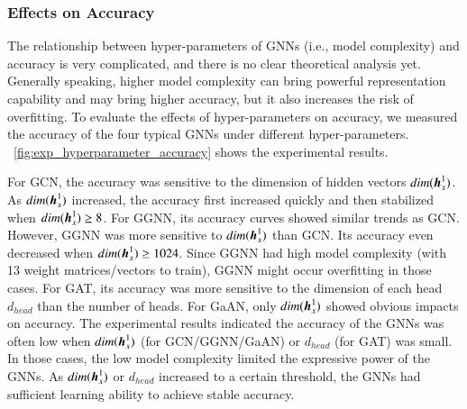 \subsubsection{Effects on Accuracy}

The relationship between hyper-parameters of GNNs (i.e., model complexity) and accuracy is very complicated, and there is no clear theoretical analysis yet.
%
Generally speaking, higher model complexity can bring powerful representation capability and may bring higher accuracy, but it also increases the risk of overfitting.
%
To evaluate the effects of hyper-parameters on accuracy, we measured the accuracy of the four typical GNNs under different hyper-parameters.
%
\figurename~\ref{fig:exp_hyperparameter_accuracy} shows the experimental results.

For GCN, the accuracy was sensitive to the dimension of hidden vectors $dim(\boldsymbol{h}^1_x)$.
%
As $dim(\boldsymbol{h}^1_x)$ increased, the accuracy first increased quickly and then stabilized when $dim(\boldsymbol{h}_x^1) \geq 8$.
%
For GGNN, its accuracy curves showed similar trends as GCN.
%
However, GGNN was more sensitive to $dim(\boldsymbol{h}_x^1)$ than GCN.
%
Its accuracy even decreased when $dim(\boldsymbol{h}_x^1) \geq 1024$.
%
Since GGNN had high model complexity (with 13 weight matrices/vectors to train), GGNN might occur overfitting in those cases.
%
For GAT, its accuracy was more sensitive to the dimension of each head $d_{head}$ than the number of heads.
%
For GaAN, only $dim(\boldsymbol{h}_x^1)$ showed obvious impacts on accuracy.
%
The experimental results indicated the accuracy of the GNNs was often low when $dim(\boldsymbol{h}_x^1)$ (for GCN/GGNN/GaAN) or $d_{head}$ (for GAT) was small.
%
In those cases, the low model complexity limited the expressive power of the GNNs.
%
As $dim(\boldsymbol{h}_x^1)$ or $d_{head}$ increased to a certain threshold, the GNNs had sufficient learning ability to achieve stable accuracy.

